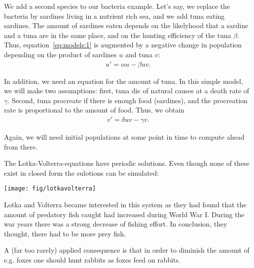 \begin{example}
  We add a second species to our bacteria example. Let's say, we
  replace the bacteria by sardines living in a nutrient rich sea, and
  we add tuna eating sardines. The amount of sardines eaten depends on
  the likelyhood that a sardine and a tuna are in the same place, and
  on the hunting efficiency of the tuna $\beta$. Thus,
  equation~\eqref{eq:models:1} is augmented by a negative change in
  population depending on the product of sardines $u$ and tuna $v$:
  \begin{gather*}
    u' = \alpha u - \beta u v.
  \end{gather*}

  In addition, we need an equation for the amount of tuna. In this
  simple model, we will make two assumptions: first, tuna die of
  natural causes at a death rate of $\gamma$. Second, tuna procreate
  if there is enough food (sardines), and the procreation rate is
  proportional to the amount of food. Thus, we obtain
  \begin{gather*}
    v' = \delta u v - \gamma v.
  \end{gather*}

  Again, we will need initial populations at some point in time to
  compute ahead from there.
\end{example}

\begin{remark}
  The Lotka-Volterra-equations have periodic solutions. Even though
  none of these exist in closed form the sulotions can be simulated:
  \begin{center}
  \texttt{[image: fig/lotkavolterra]}
  \end{center}
  Lotka and Volterra became interested in this system as they had
  found that the amount of predatory fish caught had increased
  during World War I. During the war years there was a strong
  decrease of fishing effort. In conclusion, they thought, there had
  to be more prey fish.
  
  A (far too rarely) applied consequence is that in order to diminish
  the amount of e.g. foxes one should hunt rabbits as foxes feed
  on rabbits.
\end{remark}


